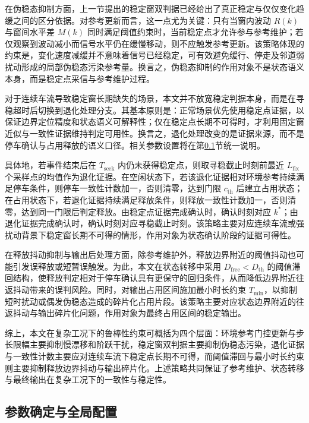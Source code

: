 \documentclass{xdupgthesis}
\begin{document}
在伪稳态抑制方面，上一节提出的稳定窗双判据已经给出了真正稳定与仅仅变化趋缓之间的区分依据。对参考更新而言，这一点尤为关键：只有当窗内波动 $R(k)$ 与窗间水平差 $M(k)$ 同时满足阈值约束时，当前稳定点才允许参与参考维护；若仅观察到波动减小而信号水平仍在缓慢移动，则不应触发参考更新。该策略体现的约束是，变化速度减缓并不意味着信号已经稳定，可有效避免缓行、停走及邻道弱扰动形成的局部伪稳态污染参考量。换言之，伪稳态抑制的作用对象不是状态语义本身，而是稳定点采信与参考维护过程。

对于连续车流导致稳定窗长期缺失的场景，本文并不放宽稳定判据本身，而是在寻稳超时后切换到退化处理分支。其基本原则是：正常场景优先使用稳定点证据，以保证边界定位精度和状态语义可解释性；仅在稳定点长期不可得时，才利用固定窗近似与一致性证据维持判定可用性。换言之，退化处理改变的是证据来源，而不是停车确认与占用释放的语义口径。相关参数设置将在第\ref{subsec:ch4_paramset}节统一说明。

具体地，若事件结束后在 $T_{\mathrm{seek}}$ 内仍未获得稳定点，则取寻稳截止时刻前最近 $L_{\mathrm{fix}}$ 个采样点的均值作为退化证据。在空闲状态下，若该退化证据相对环境参考持续满足停车条件，则停车一致性计数加一，否则清零，达到门限 $c_{\mathrm{th}}$ 后建立占用状态；在占用状态下，若退化证据持续满足释放条件，则释放一致性计数加一，否则清零，达到同一门限后判定释放。由稳定点证据完成确认时，确认时刻对应 $k^\ast$；由退化证据完成确认时，确认时刻对应寻稳截止时刻。该策略主要对应连续车流或强扰动背景下稳定窗长期不可得的情形，作用对象为状态确认阶段的证据可得性。

在释放抖动抑制与输出后处理方面，除参考维护外，释放边界附近的阈值抖动也可能引发误释放或短暂误触发。为此，本文在状态转移中采用 $D_{\mathrm{free}}<D_{\mathrm{th}}$ 的阈值滞回结构，使释放判定相对于停车确认具有更保守的回归条件，从而降低边界附近往返抖动带来的误判风险。同时，对输出占用区间施加最小时长约束 $T_{\min}$，以抑制短时扰动或偶发伪稳态造成的碎片化占用片段。该策略主要对应状态边界附近的往返抖动与输出碎片化问题，作用对象为最终占用区间的稳定输出。

综上，本文在复杂工况下的鲁棒性约束可概括为四个层面：环境参考门控更新与步长限幅主要抑制慢漂移和阶跃干扰，稳定窗双判据主要抑制伪稳态污染，退化证据与一致性计数主要应对连续车流下稳定点长期不可得，而阈值滞回与最小时长约束则主要抑制释放边界抖动与输出碎片化。上述策略共同保证了参考维护、状态转移与最终输出在复杂工况下的一致性与稳定性。

\subsection{参数确定与全局配置}
\label{subsec:ch4_paramset}
\end{document}
